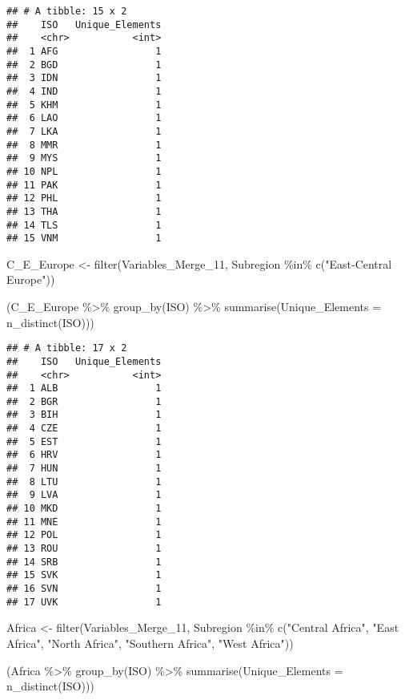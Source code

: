 \documentclass[
]{article}
\newenvironment{Shaded}{\begin{snugshade}}{\end{snugshade}}
\newcommand{\AttributeTok}[1]{\textcolor[rgb]{0.77,0.63,0.00}{#1}}
\newcommand{\FunctionTok}[1]{\textcolor[rgb]{0.00,0.00,0.00}{#1}}
\newcommand{\NormalTok}[1]{#1}
\newcommand{\OtherTok}[1]{\textcolor[rgb]{0.56,0.35,0.01}{#1}}
\newcommand{\SpecialCharTok}[1]{\textcolor[rgb]{0.00,0.00,0.00}{#1}}
\newcommand{\StringTok}[1]{\textcolor[rgb]{0.31,0.60,0.02}{#1}}
\begin{document}
\begin{verbatim}
## # A tibble: 15 x 2
##    ISO   Unique_Elements
##    <chr>           <int>
##  1 AFG                 1
##  2 BGD                 1
##  3 IDN                 1
##  4 IND                 1
##  5 KHM                 1
##  6 LAO                 1
##  7 LKA                 1
##  8 MMR                 1
##  9 MYS                 1
## 10 NPL                 1
## 11 PAK                 1
## 12 PHL                 1
## 13 THA                 1
## 14 TLS                 1
## 15 VNM                 1
\end{verbatim}

\begin{Shaded}
\begin{Highlighting}[]
\NormalTok{C\_E\_Europe }\OtherTok{\textless{}{-}} \FunctionTok{filter}\NormalTok{(Variables\_Merge\_11, Subregion }\SpecialCharTok{\%in\%} \FunctionTok{c}\NormalTok{(}\StringTok{"East{-}Central Europe"}\NormalTok{))}

\NormalTok{(C\_E\_Europe }\SpecialCharTok{\%\textgreater{}\%}                   
  \FunctionTok{group\_by}\NormalTok{(ISO) }\SpecialCharTok{\%\textgreater{}\%}          
  \FunctionTok{summarise}\NormalTok{(}\AttributeTok{Unique\_Elements =} \FunctionTok{n\_distinct}\NormalTok{(ISO)))}
\end{Highlighting}
\end{Shaded}

\begin{verbatim}
## # A tibble: 17 x 2
##    ISO   Unique_Elements
##    <chr>           <int>
##  1 ALB                 1
##  2 BGR                 1
##  3 BIH                 1
##  4 CZE                 1
##  5 EST                 1
##  6 HRV                 1
##  7 HUN                 1
##  8 LTU                 1
##  9 LVA                 1
## 10 MKD                 1
## 11 MNE                 1
## 12 POL                 1
## 13 ROU                 1
## 14 SRB                 1
## 15 SVK                 1
## 16 SVN                 1
## 17 UVK                 1
\end{verbatim}

\begin{Shaded}
\begin{Highlighting}[]
\NormalTok{Africa }\OtherTok{\textless{}{-}} \FunctionTok{filter}\NormalTok{(Variables\_Merge\_11, Subregion }\SpecialCharTok{\%in\%} \FunctionTok{c}\NormalTok{(}\StringTok{"Central Africa"}\NormalTok{, }\StringTok{"East Africa"}\NormalTok{, }\StringTok{"North Africa"}\NormalTok{, }\StringTok{"Southern Africa"}\NormalTok{, }\StringTok{"West Africa"}\NormalTok{))}

\NormalTok{(Africa }\SpecialCharTok{\%\textgreater{}\%}                   
  \FunctionTok{group\_by}\NormalTok{(ISO) }\SpecialCharTok{\%\textgreater{}\%}          
  \FunctionTok{summarise}\NormalTok{(}\AttributeTok{Unique\_Elements =} \FunctionTok{n\_distinct}\NormalTok{(ISO)))}
\end{Highlighting}
\end{Shaded}
\end{document}
